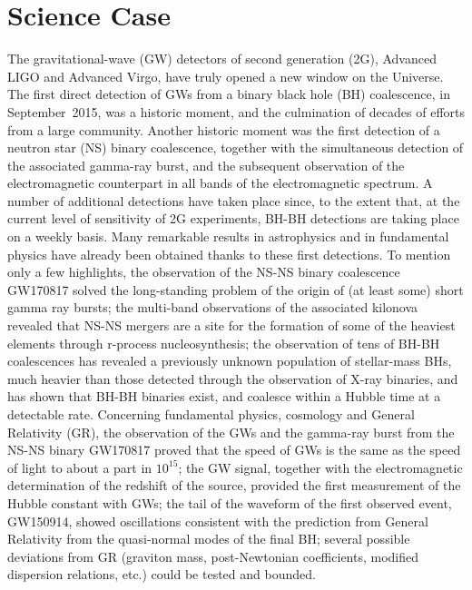 \chapter{Science Case}
\label{chap:ScienceCase}

The gravitational-wave (GW) detectors of second generation (2G), Advanced LIGO and Advanced Virgo, have truly opened a new window on the Universe. The first direct detection of GWs from a binary black hole (BH) coalescence, in September~2015,  was a historic moment, and the culmination of decades of efforts from a large community. Another historic moment was the first detection of a neutron star (NS) binary coalescence, together with the simultaneous detection of the associated gamma-ray burst, and the subsequent observation of the electromagnetic counterpart in all bands of the electromagnetic spectrum. A number of additional detections have taken place since,  to the extent that, at the current level of sensitivity of 2G experiments, BH-BH detections are taking place on a weekly basis.
Many remarkable results in astrophysics and in fundamental physics have already been obtained thanks to these first detections. To mention only a few highlights,  the observation of the NS-NS binary coalescence GW170817 solved the long-standing problem of the origin of (at least some) short gamma ray bursts; the multi-band observations of the associated kilonova revealed that NS-NS mergers are a site for  the  formation of some of the heaviest elements through r-process nucleosynthesis; the observation of tens of BH-BH coalescences has  revealed a previously unknown population of stellar-mass BHs, much heavier than those detected through the observation of X-ray binaries, and has shown that BH-BH binaries exist, and coalesce within a Hubble time at a detectable rate.  Concerning  fundamental physics, cosmology and General Relativity (GR), the observation of the GWs and the gamma-ray burst from the NS-NS binary GW170817 proved that the speed of GWs is the same as the speed of light to about a part in $10^{15}$; the GW signal, together with the electromagnetic determination of the redshift of the source, provided the first measurement of the Hubble constant with GWs;  the tail of the waveform of the first observed event, GW150914, showed  oscillations consistent with the prediction from General Relativity  from the quasi-normal modes of the final BH; several  possible deviations from GR (graviton mass, post-Newtonian coefficients, modified dispersion relations, etc.) could be tested and bounded.


